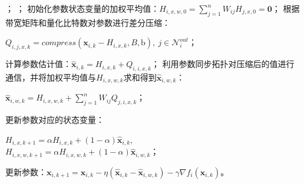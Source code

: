 \begin{center}
    \begin{algorithm}[!htbp]
            \caption{节点$i$上的BA-QDSGD算法的伪代码} 
            \label{Algorithm-BA-QDSGD} 
            \begin{algorithmic}[1]
            ；
            ；
            \STATE 初始化参数状态变量的加权平均值：$H_{i,x,w,0}=\sum_{j=1}^n{W_{ij}}H_{j,x,0}=\mathbf{0}$；
                \STATE 根据带宽矩阵和量化比特数对参数进行差分压缩：\\\begin{center}$Q_{i,j,x,k}=compress\left( \boldsymbol{x}_{i,k}-H_{i,x,k},B,\mathrm{b} \right) ,\ j\in \mathcal{N} _{i}^{out} $；\end{center}
                \STATE 计算参数估计值：$\hat{\boldsymbol{x}}_{i,k}=H_{i,x,k}+Q_{i,i,x,k}$；
                \STATE 利用参数同步拓扑对压缩后的值进行通信，并将加权平均值与$H_{i,x,w,k}$求和得到$\hat{\boldsymbol{x}}_{i,w,k}$：\\\begin{center}$\hat{\boldsymbol{x}}_{i,w,k}=H_{i,x,w,k}+\sum_{j=1}^n{W_{ij}}Q_{j,i,x,k}$；\end{center}
                \STATE 更新参数对应的状态变量：\\\begin{center}$H_{i,x,k+1}=\alpha H_{i,x,k}+\left( 1-\alpha \right) \hat{\boldsymbol{x}}_{i,k},$\\$H_{i,x,w,k+1}=\alpha H_{i,x,w,k}+\left( 1-\alpha \right) \hat{\boldsymbol{x}}_{i,w,k}$；\end{center}
                \STATE 更新参数：$\boldsymbol{x}_{i,k+1}=\boldsymbol{x}_{i,k}-\eta \left( \hat{\boldsymbol{x}}_{i,k}-\hat{\boldsymbol{x}}_{i,w,k} \right) -\gamma \nabla f_i\left( \boldsymbol{x}_{i,k} \right) $。
            \ENDFOR            
            \end{algorithmic}
    \end{algorithm}
\end{center}


